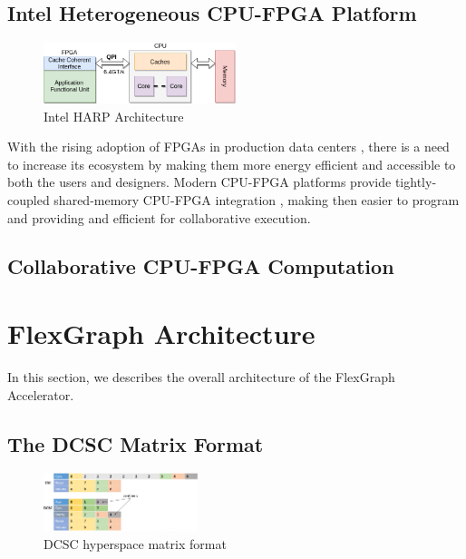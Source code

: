 \subsection{Intel Heterogeneous CPU-FPGA Platform}

\begin{figure}[htbp]
\centering
\includegraphics[width=0.5\textwidth]{figures/harp_arch}
\caption{Intel HARP Architecture}
\label{fig:harp_arch}
\end{figure}

With the rising adoption of FPGAs in production data centers \cite{Catapult}, there is a need to increase its ecosystem by making them more energy efficient and accessible to both the users and designers. Modern CPU-FPGA platforms \cite{CPU-FPGA} provide tightly-coupled shared-memory CPU-FPGA integration \cite{CAPI} \cite{CCI}, making then easier to program and providing and efficient for collaborative execution.  

\subsection{Collaborative CPU-FPGA Computation}

\section{FlexGraph Architecture}

In this section, we describes the overall architecture of the FlexGraph Accelerator.

\subsection{The DCSC Matrix Format}

\begin{figure}[htbp]
\centering
\includegraphics[width=0.4\textwidth]{figures/DCSC_matrix_format}
\caption{DCSC hyperspace matrix format}
\label{fig:DCSC_matrix_format}
\end{figure}


